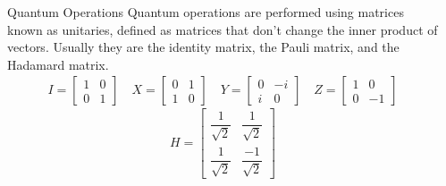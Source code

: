 \documentclass[final, 20pt]{beamer}
\newlength{\onecolwid}
\newlength{\twocolwid}
\begin{document}
\begin{frame}[t]
\begin{columns}[t]
\begin{column}{\twocolwid}
\begin{columns}[t,totalwidth=\twocolwid]
\begin{column}{\onecolwid}
\end{column} %

\begin{column}{\onecolwid} %


\begin{block}{Quantum Operations}
Quantum operations are performed using matrices known as unitaries, defined as matrices that don't change the inner product of vectors. Usually they are the identity matrix, the Pauli matrix, and the Hadamard matrix. 
\begin{align}
	I = \begin{bmatrix} 
	1 & 0 \\
	0 & 1 
	\end{bmatrix}
	\quad
	X = \begin{bmatrix} 
	0 & 1 \\
	1 & 0 
	\end{bmatrix}
	\quad
	Y = \begin{bmatrix} 
	0 & -i \\
	i & 0 
	\end{bmatrix}
	\quad
	Z = \begin{bmatrix} 
	1 & 0 \\
	0 & -1 
	\end{bmatrix}
\end{align}
\begin{equation}
	H = \begin{bmatrix} 
	\dfrac{1}{\sqrt{2}} & \dfrac{1}{\sqrt{2}} \\
	\dfrac{1}{\sqrt{2}} & \dfrac{-1}{\sqrt{2}} 
	\end{bmatrix}
\end{equation}


\end{block}
\end{column}
\end{columns}
\end{column}
\end{columns}
\end{frame}
\end{document}
